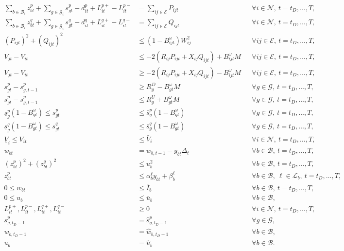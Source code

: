 \documentclass[10pt]{article}
\begin{document}
\begin{align}
\sum_{b\in\mathcal B_i}z_{bt}^p+\sum_{g\in\mathcal G_i}s_{gt}^p-d_{it}^p+L_{it}^{p+}-L_{it}^{p-}&=\sum_{ij\in\mathcal E}P_{ijt} &&\forall i\in\mathcal N,\ t=t_D,\ldots,T, \tag{2b}\\
\sum_{b\in\mathcal B_i}z_{bt}^q+\sum_{g\in\mathcal G_i}s_{gt}^q-d_{it}^q+L_{it}^{q+}-L_{it}^{q-}&=\sum_{ij\in\mathcal E}Q_{ijt} &&\forall i\in\mathcal N,\ t=t_D,\ldots,T, \tag{2c}\\
(P_{ijt})^2+(Q_{ijt})^2&\leq(1-B_{ijt}^{\omega})W_{ij}^2 &&\forall ij\in\mathcal E,\ t=t_D,\ldots,T, \tag{2d}\\
V_{jt}-V_{it}&\leq-2(R_{ij}P_{ijt}+X_{ij}Q_{ijt})+B_{ijt}^{\omega}M &&\forall ij\in\mathcal E,\ t=t_D,\ldots,T, \tag{2e}\\
V_{jt}-V_{it}&\geq-2(R_{ij}P_{ijt}+X_{ij}Q_{ijt})-B_{ijt}^{\omega}M &&\forall ij\in\mathcal E,\ t=t_D,\ldots,T, \tag{2f}\\
s_{gt}^p-s_{g,t-1}^p&\geq R_g^D-B_{gt}^{\omega}M &&\forall g\in\mathcal G,\ t=t_D,\ldots,T, \tag{2g}\\
s_{gt}^p-s_{g,t-1}^p&\leq R_g^U+B_{gt}^{\omega}M &&\forall g\in\mathcal G,\ t=t_D,\ldots,T, \tag{2h}\\
\underline{s}_g^p(1-B_{gt}^{\omega})\leq s_{gt}^p&\leq\bar{s}_g^p(1-B_{gt}^{\omega}) &&\forall g\in\mathcal G,\ t=t_D,\ldots,T, \tag{2i}\\
\underline{s}_g^q(1-B_{gt}^{\omega})\leq s_{gt}^q&\leq\bar{s}_g^q(1-B_{gt}^{\omega}) &&\forall g\in\mathcal G,\ t=t_D,\ldots,T, \tag{2j}\\
\underline V_i\leq V_{it}&\leq\bar V_i &&\forall i\in\mathcal N,\ t=t_D,\ldots,T, \tag{2k}\\
w_{bt}&=w_{b,t-1}-y_{bt}\Delta_t &&\forall b\in\mathcal B,\ t=t_D,\ldots,T, \tag{2l}\\
(z_{bt}^p)^2+(z_{bt}^q)^2&\leq u_b^2 &&\forall b\in\mathcal B,\ t=t_D,\ldots,T, \tag{2m}\\
z_{bt}^p&\leq\alpha_b^\ell y_{bt}+\beta_b^\ell &&\forall b\in\mathcal B,\ \ell\in\mathcal L_b,\ t=t_D,\ldots,T, \tag{2n}\\
0\leq w_{bt}&\leq\bar I_b &&\forall b\in\mathcal B,\ t=t_D,\ldots,T, \tag{2o}\\
0\leq u_b&\leq\bar u_b &&\forall b\in\mathcal B, \tag{2p}\\
L_{it}^{p+},L_{it}^{p-},L_{it}^{q+},L_{it}^{q-}&\geq0 &&\forall i\in\mathcal N,\ t=t_D,\ldots,T, \tag{2q}\\
s_{g,t_D-1}^p&=\hat s_{g,t_D-1}^p &&\forall g\in\mathcal G, \tag{2r}\\
w_{b,t_D-1}&=\hat w_{b,t_D-1} &&\forall b\in\mathcal B, \tag{2s}\\
u_b&=\hat u_b &&\forall b\in\mathcal B. \tag{2t}
\end{align}
\end{document}
